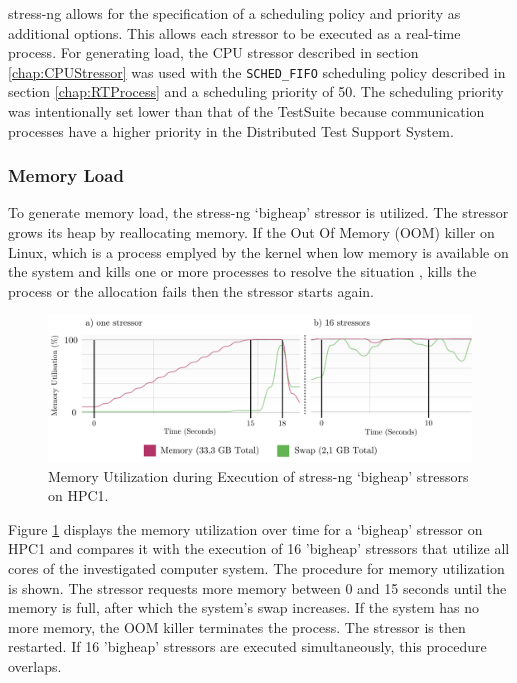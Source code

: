 stress-ng allows for the specification of a scheduling policy and priority as additional options. This allows each stressor to be executed as a real-time process. For generating load, the CPU stressor described in section \ref{chap:CPUStressor} was used with the \texttt{SCHED\_FIFO} scheduling policy described in section \ref{chap:RTProcess} and a scheduling priority of 50. The scheduling priority was intentionally set lower than that of the TestSuite because communication processes have a higher priority in the Distributed Test Support System.

\subsubsection{Memory Load} \label{chap:stressngMemeory}
To generate memory load, the stress-ng `bigheap' stressor is utilized. The stressor grows its heap by reallocating memory. If the Out Of Memory (OOM) killer on Linux, which is a process emplyed by the kernel when low memory is available on the system and kills one or more processes to resolve the situation \cite{stress09}, kills the process or the allocation fails then the stressor starts again.

\begin{figure}[h!]
    \centering
    \includegraphics[width=1\linewidth]{figures/method/stress3.pdf}
    \caption{Memory Utilization during Execution of stress-ng `bigheap' stressors on HPC1.}
    \label{fig:stressMEM}
\end{figure}

Figure \ref{fig:stressMEM} displays the memory utilization over time for a `bigheap' stressor on HPC1 and compares it with the execution of 16 'bigheap' stressors that utilize all cores of the investigated computer system. The procedure for memory utilization is shown. The stressor requests more memory between 0 and 15 seconds until the memory is full, after which the system's swap increases. If the system has no more memory, the OOM killer terminates the process. The stressor is then restarted. If 16 'bigheap' stressors are executed simultaneously, this procedure overlaps.

